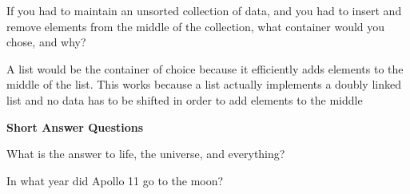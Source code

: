 \documentclass[10pt,addpoints]{exam}
\begin{document}
\begin{questions}
\par\vspace{0.100000in}\begin{minipage}{\linewidth}
\question[10]

If you had to maintain an unsorted collection of data, and you had to insert
and remove elements from the middle of the collection, what container would
you chose, and why?

\begin{solution}[3in]

A list would be the container of choice because it efficiently adds elements
to the middle of the list. This works because a list actually implements a
doubly linked list and no data has to be shifted in order to add elements to
the middle

\end{solution}
\end{minipage}





\newpage
\begin{center}
{\Large \textbf{Short Answer Questions}}
\end{center}

\par\vspace{0.100000in}\begin{minipage}{\linewidth}
\vspace{.35cm}\question[2]
What is the answer to life, the universe, and everything?
\vspace{.25cm}\setlength\answerlinelength{1in}
\answerline[42]
\end{minipage}


\par\vspace{0.100000in}\begin{minipage}{\linewidth}
\vspace{.35cm}\question[2]
In what year did Apollo 11 go to the moon?
\vspace{.25cm}\setlength\answerlinelength{1in}
\answerline[1969]
\end{minipage}



\end{questions}
\end{document}
